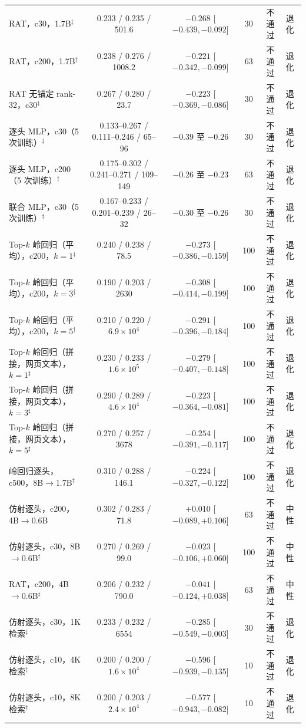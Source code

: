 \documentclass[10pt,a4paper,fontset=fandol]{ctexart}
\begin{document}
\begin{table}[t]
{\begin{tabular}{lccccl}
RAT，c30，1.7B$^{\ddagger}$ & 0.233 / 0.235 / 501.6 & $-0.268$ [$-0.439, -0.092$] & 30 & 不通过 & 退化 \\
RAT，c200，1.7B$^{\ddagger}$ & 0.238 / 0.276 / 1008.2 & $-0.221$ [$-0.342, -0.099$] & 63 & 不通过 & 退化 \\
RAT 无锚定 rank-32，c30$^{\ddagger}$ & 0.267 / 0.280 / 23.7 & $-0.223$ [$-0.369, -0.086$] & 30 & 不通过 & 退化 \\
逐头 MLP，c30（5 次训练）$^{\ddagger}$ & 0.133--0.267 / 0.111--0.246 / 65--96 & $-0.39$ 至 $-0.26$ & 30 & 不通过 & 退化 \\
逐头 MLP，c200（5 次训练）$^{\ddagger}$ & 0.175--0.302 / 0.241--0.271 / 109--149 & $-0.26$ 至 $-0.23$ & 63 & 不通过 & 退化 \\
联合 MLP，c30（5 次训练）$^{\ddagger}$ & 0.167--0.233 / 0.201--0.239 / 26--32 & $-0.30$ 至 $-0.26$ & 30 & 不通过 & 退化 \\
Top-$k$ 岭回归（平均），c200，$k{=}1$$^{\ddagger}$ & 0.240 / 0.238 / 78.5 & $-0.273$ [$-0.386, -0.159$] & 100 & 不通过 & 退化 \\
Top-$k$ 岭回归（平均），c200，$k{=}3$$^{\ddagger}$ & 0.190 / 0.203 / 2630 & $-0.308$ [$-0.414, -0.199$] & 100 & 不通过 & 退化 \\
Top-$k$ 岭回归（平均），c200，$k{=}5$$^{\ddagger}$ & 0.210 / 0.220 / $6.9\times10^{4}$ & $-0.291$ [$-0.396, -0.184$] & 100 & 不通过 & 退化 \\
Top-$k$ 岭回归（拼接，网页文本），$k{=}1$$^{\sharp}$ & 0.230 / 0.233 / $1.6\times10^{5}$ & $-0.279$ [$-0.407, -0.148$] & 100 & 不通过 & 退化 \\
Top-$k$ 岭回归（拼接，网页文本），$k{=}3$$^{\sharp}$ & 0.290 / 0.289 / $4.6\times10^{4}$ & $-0.223$ [$-0.364, -0.081$] & 100 & 不通过 & 退化 \\
Top-$k$ 岭回归（拼接，网页文本），$k{=}5$$^{\sharp}$ & 0.270 / 0.257 / 3678 & $-0.254$ [$-0.391, -0.117$] & 100 & 不通过 & 退化 \\
岭回归逐头，c500，8B$\to$1.7B$^{\ddagger}$ & 0.310 / 0.288 / 146.1 & $-0.224$ [$-0.327, -0.122$] & 100 & 不通过 & 退化 \\
仿射逐头，c200，4B$\to$0.6B & 0.302 / 0.283 / 71.8 & $+0.010$ [$-0.089, +0.106$] & 63 & 不通过 & 中性 \\
仿射逐头，c30，8B$\to$0.6B$^{\ddagger}$ & 0.270 / 0.269 / 99.0 & $-0.023$ [$-0.106, +0.060$] & 100 & 不通过 & 中性 \\
RAT，c200，4B$\to$0.6B$^{\ddagger}$ & 0.206 / 0.232 / 790.0 & $-0.041$ [$-0.124, +0.038$] & 63 & 不通过 & 中性 \\
仿射逐头，c30，1K 检索$^{\ddagger}$ & 0.233 / 0.232 / 6554 & $-0.285$ [$-0.549, -0.003$] & 30 & 不通过 & 退化 \\
仿射逐头，c10，4K 检索$^{\ddagger}$ & 0.200 / 0.200 / $1.6\times10^{4}$ & $-0.596$ [$-0.939, -0.135$] & 10 & 不通过 & 退化 \\
仿射逐头，c10，8K 检索$^{\ddagger}$ & 0.200 / 0.203 / $2.4\times10^{4}$ & $-0.577$ [$-0.943, -0.082$] & 10 & 不通过 & 退化 \\
\bottomrule
\end{tabular}}
\end{table}
\end{document}
